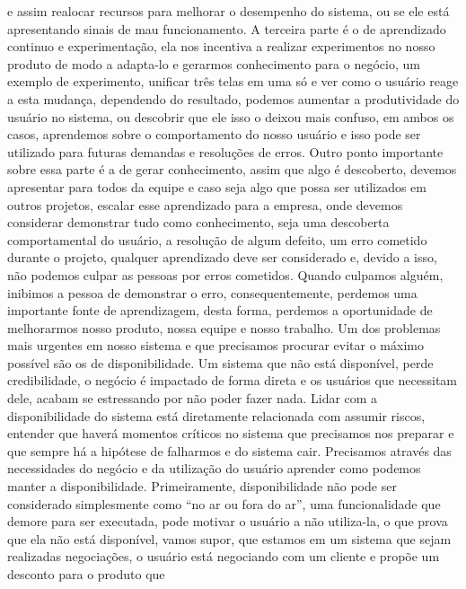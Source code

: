     e assim realocar recursos para melhorar o desempenho do sistema, ou se ele está
    apresentando sinais de mau funcionamento. A terceira parte é o de aprendizado
    continuo e experimentação, ela nos incentiva a realizar experimentos no nosso
    produto de modo a adapta-lo e gerarmos conhecimento para o negócio, um exemplo de
    experimento, unificar três telas em uma só e ver como o usuário reage a esta
    mudança, dependendo do resultado, podemos aumentar a produtividade do usuário
    no sistema, ou descobrir que ele isso o deixou mais confuso, em ambos os casos,
    aprendemos sobre o comportamento do nosso usuário e isso pode ser utilizado para
    futuras demandas e resoluções de erros. Outro ponto importante sobre essa parte
    é a de gerar conhecimento, assim que algo é descoberto, devemos apresentar para
    todos da equipe e caso seja algo que possa ser utilizados em outros projetos,
    escalar esse aprendizado para a empresa, onde devemos considerar demonstrar
    tudo como conhecimento, seja uma descoberta comportamental do usuário,
    a resolução de algum defeito, um erro cometido durante o projeto, qualquer
    aprendizado deve ser considerado e, devido a isso, não podemos culpar
    as pessoas por erros cometidos. Quando culpamos alguém, inibimos a pessoa de
    demonstrar o erro, consequentemente, perdemos uma importante fonte de aprendizagem,
    desta forma, perdemos a oportunidade de melhorarmos nosso produto, nossa equipe
    e nosso trabalho. \newline
    Um dos problemas mais urgentes em nosso sistema e que precisamos procurar evitar
    o máximo possível são os de disponibilidade. Um sistema que não está disponível,
    perde credibilidade, o negócio é impactado de forma direta e os usuários que
    necessitam dele, acabam se estressando por não poder fazer nada. Lidar com a
    disponibilidade do sistema está diretamente relacionada com assumir riscos,
    entender que haverá momentos críticos no sistema que precisamos nos preparar e
    que sempre há a hipótese de falharmos e do sistema cair. Precisamos através das
    necessidades do negócio e da utilização do usuário aprender como podemos manter
    a disponibilidade. Primeiramente, disponibilidade não pode ser considerado
    simplesmente como “no ar ou fora do ar”, uma funcionalidade que demore para ser
    executada, pode motivar o usuário a não utiliza-la, o que prova que ela não está
    disponível, vamos supor, que estamos em um sistema que sejam realizadas negociações,
    o usuário está negociando com um cliente e propõe um desconto para o produto que
